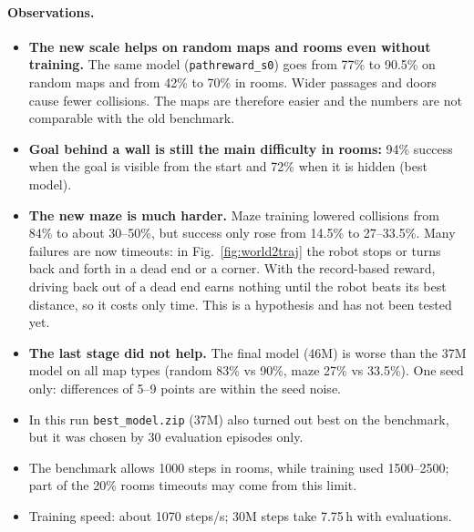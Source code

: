 \documentclass[11pt,a4paper]{article}
\newcommand{\code}[1]{\texttt{#1}}
\begin{document}
\paragraph{Observations.}
\begin{itemize}[leftmargin=*]
      \item \textbf{The new scale helps on random maps and rooms even without
            training.} The same model (\code{pathreward\_s0}) goes from 77\% to
            90.5\% on random maps and from 42\% to 70\% in rooms. Wider passages
            and doors cause fewer collisions. The maps are therefore easier and the
            numbers are not comparable with the old benchmark.
      \item \textbf{Goal behind a wall is still the main difficulty in rooms:}
            94\% success when the goal is visible from the start and 72\% when it is
            hidden (best model).
      \item \textbf{The new maze is much harder.} Maze training lowered collisions from
            84\% to about 30--50\%, but success only rose from 14.5\% to 27--33.5\%.
            Many failures are now timeouts: in Fig.~\ref{fig:world2traj} the robot
            stops or turns back and forth in a dead end or a corner. With the
            record-based reward, driving back out of a dead end earns nothing
            until the robot beats its best distance, so it costs only time.
            This is a hypothesis and has not been tested yet.
      \item \textbf{The last stage did not help.} The final model (46M) is worse than the
            37M model on all map types (random 83\% vs 90\%, maze 27\% vs 33.5\%).
            One seed only: differences of 5--9 points are within the seed noise.
      \item In this run \code{best\_model.zip} (37M) also turned out best on the benchmark,
            but it was chosen by 30 evaluation episodes only.
      \item The benchmark allows 1000 steps in rooms, while training used 1500--2500;
            part of the 20\% rooms timeouts may come from this limit.
      \item Training speed: about 1070 steps/s; 30M steps take 7.75\,h with evaluations.
\end{itemize}

\end{document}
